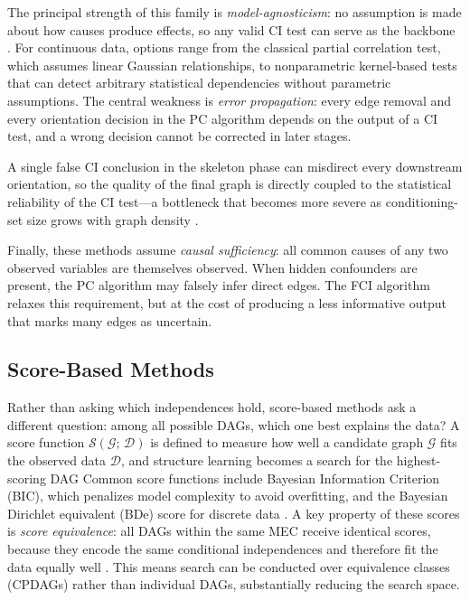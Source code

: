 The principal strength of this family is \emph{model-agnosticism}: no assumption is made about how causes produce effects, so any valid CI test can serve as the backbone \cite{Pearl_2009}. For continuous data, options range from the classical partial correlation test, which assumes linear Gaussian relationships, to nonparametric kernel-based tests \cite{Zhang2011KernelbasedCI} that can detect arbitrary statistical dependencies without parametric assumptions. The central weakness is \emph{error propagation}: every edge removal and every orientation decision in the PC algorithm depends on the output of a CI test, and a wrong decision cannot be corrected in later stages.

A single false CI conclusion in the skeleton phase can misdirect every downstream orientation, so the quality of the final graph is directly coupled to the statistical reliability of the CI test---a bottleneck that becomes more severe as conditioning-set size grows with graph density \cite{Spirtes2001CausationPA, Peters2017ElementsOC}.

Finally, these methods assume \emph{causal sufficiency}: all common causes of any two observed variables are themselves observed.
When hidden confounders are present, the PC algorithm may falsely infer direct edges.
The FCI algorithm \cite{Spirtes1995CausalII} relaxes this requirement, but at the cost of producing a less informative output that marks many edges as uncertain.

\subsection*{Score-Based Methods}\label{sec:score-based}

Rather than asking which independences hold, score-based methods ask a different question: among all possible DAGs, which one best explains the data?
A score function $\mathcal{S}(\mathcal{G};\,\mathcal{D})$ is defined to measure how well a candidate graph $\mathcal{G}$ fits the observed data $\mathcal{D}$, and structure learning becomes a search for the highest-scoring DAG \cite{Chickering1996LearningEC, Peters2017ElementsOC}
Common score functions include Bayesian Information Criterion (BIC), which penalizes model complexity to avoid overfitting, and the Bayesian Dirichlet equivalent (BDe) score for discrete data \cite{Chickering2002OptimalSI}.
A key property of these scores is \emph{score equivalence}: all DAGs within the same MEC receive identical scores, because they encode the same conditional independences and therefore fit the data equally well \cite{Chickering2002OptimalSI}.
This means search can be conducted over equivalence classes (CPDAGs) rather than individual DAGs, substantially reducing the search space.

